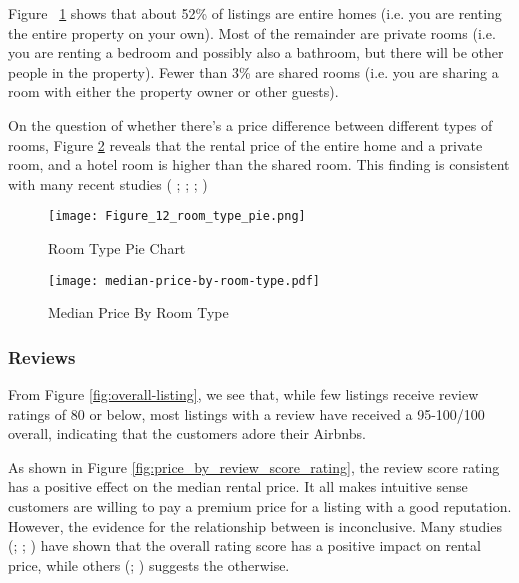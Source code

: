 Figure ~\ref{fig:room_type_pie} shows that about 52\% of listings are entire homes
(i.e. you are renting the entire property on your own). Most of the remainder
are private rooms (i.e. you are renting a bedroom and possibly also a bathroom,
but there will be other people in the property). Fewer than 3\% are shared rooms
(i.e. you are sharing a room with either the property owner or other guests).

On the question of whether there's a price difference between different types of
rooms, Figure \ref{fig:room_type_price} reveals that the rental price of the
entire home and a private room, and a hotel room is higher than the shared room.
This finding is consistent with many recent studies (\cite{cai2019price} ;
\cite{benitez2018flexible}; \cite{chen2017consumer}; \cite{gibbs2018use})

\begin{figure}[H]
    \centering
        \centering
        \texttt{[image: Figure\_12\_room\_type\_pie.png]}
        \caption{Room Type Pie Chart}
        \label{fig:room_type_pie}
\end{figure}

\begin{figure}[H]
        \centering
        \texttt{[image: median-price-by-room-type.pdf]}
        \caption{Median Price By Room Type}
        \label{fig:room_type_price}
\end{figure}

\subsubsection*{Reviews}

From Figure   \ref{fig:overall-listing}, we see that, while few listings receive
review ratings of 80 or below, most listings with a review have received a
95-100/100 overall,  indicating that the customers adore their Airbnbs.


As shown in Figure \ref{fig:price_by_review_score_rating}, the review score
rating has a positive effect on the median rental price. It all makes intuitive
sense customers are willing to pay a premium price for a listing with a good
reputation.  However, the evidence for the relationship between is inconclusive.
Many studies (\cite{chen2017consumer}; \cite{gibbs2018use};
\cite{wang2017price}) have shown that the overall rating score has a positive
impact on rental price, while others (\cite{li2016pros}; \cite{zhang2017key})
suggests the otherwise.

